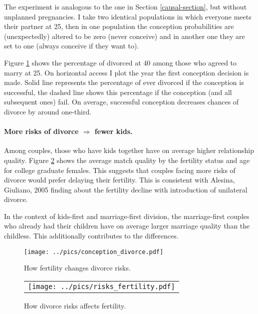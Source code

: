 \documentclass[12pt,letter]{article}
\begin{document}
The experiment is analogous to the one in Section \ref{causal-section}, but without unplanned pregnancies. I take two identical populations in which everyone meets their partner at 25, then in one population the conception probabilities are (unexpectedly) altered to be zero (never conceive) and in another one they are set to one (always conceive if they want to).

Figure \ref{conception-divorce} shows the percentage of divorced at 40 among those who agreed to marry at 25. On horizontal access I plot the year the first conception decision is made. Solid line represents the percentage of ever divorced if the conception is successful, the dashed line shows this percentage if the conception (and all subsequent ones) fail. On average, successful conception decreases chances of divorce by around one-third. 

\paragraph{More risks of divorce $\Rightarrow$ fewer kids.} Among couples, those who have kids together have on average higher relationship quality. Figure \ref{risks-fertility} shows the average match quality by the fertility status and age for college graduate females. This suggests that couples facing more risks of divorce would prefer delaying their fertility. This is consistent with Alesina, Giuliano, 2005 finding about the fertility decline with introduction of unilateral divorce.

In the context of kids-first and marriage-first division, the marriage-first couples who already had their children have on average larger marriage quality than the childless. This additionally contributes to the differences.

\begin{figure}
\begin{center}
\texttt{[image: ../pics/conception\_divorce.pdf]}  
\caption{How fertility changes divorce risks.\label{conception-divorce}}
\end{center}
\end{figure}


\begin{figure}
\begin{center}
\begin{tabular}{c}
\texttt{[image: ../pics/risks\_fertility.pdf]} 
\end{tabular}
\caption{How divorce risks affects fertility.\label{risks-fertility}}
\end{center}
\end{figure}
\end{document}

